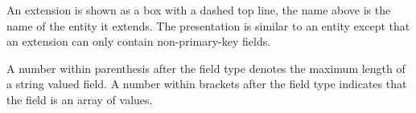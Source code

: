 \documentclass[techdoc]{nobs}   %
\begin{document}
An extension is shown as a box with a dashed top line, the name above is the
name of the entity it extends. The presentation is similar to an entity except
that an extension can only contain non-primary-key fields.

A number within parenthesis after the field type denotes the maximum length of
a string valued field. A number within brackets after the field type indicates
that the field is an array of values.


\label{sec:details}



\clearpage

%




\end{document}
